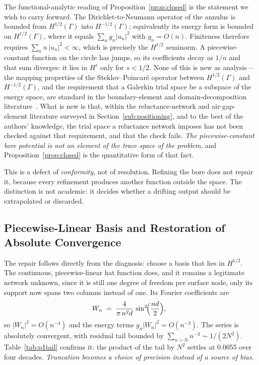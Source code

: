 \documentclass[10pt,a4paper,twocolumn]{article}
\theoremstyle{plain}
\theoremstyle{remark}
\begin{document}
The functional-analytic reading of Proposition~\ref{prop:closed} is the
statement we wish to carry forward. The Dirichlet-to-Neumann operator of
the annulus is bounded from $H^{1/2}(\Gamma)$ into $H^{-1/2}(\Gamma)$;
equivalently its energy form is bounded on $H^{1/2}(\Gamma)$, where it
equals $\sum_n g_n|u_n|^{2}$ with $g_n=O(n)$. Finiteness therefore
requires $\sum_n n\,|u_n|^{2}<\infty$, which is precisely the
$H^{1/2}$ seminorm. A piecewise-constant function on the circle has
jumps, so its coefficients decay as $1/n$ and that sum diverges: it lies
in $H^{s}$ only for $s<1/2$. None of this is new as analysis---the
mapping properties of the Steklov--Poincar\'e operator between
$H^{1/2}(\Gamma)$ and $H^{-1/2}(\Gamma)$, and the requirement that a
Galerkin trial space be a subspace of the energy space, are standard in
the boundary-element and domain-decomposition
literature~\cite{mclean2000,steinbach2008,sauter2011}. What is new is
that, within the reluctance-network and air-gap-element literature
surveyed in Section~\ref{sub:positioning}, and to the best of the
authors' knowledge, the trial space a reluctance network imposes has not
been checked against that requirement, and that the check fails. \emph{The piecewise-constant bore potential
is not an element of the trace space of the problem}, and
Proposition~\ref{prop:closed} is the quantitative form of that fact.

This is a defect of \emph{conformity}, not of resolution. Refining the
bore does not repair it, because every refinement produces another
function outside the space. The distinction is not academic: it decides
whether a drifting output should be extrapolated or discarded.


\subsection{Piecewise-Linear Basis and Restoration of Absolute Convergence}
\label{sub:p1}

The repair follows directly from the diagnosis: choose a basis that lies
in $H^{1/2}$. The continuous, piecewise-linear hat function does, and it
remains a legitimate network unknown, since it is still one degree of
freedom per surface node, only its support now spans two columns
instead of one. Its Fourier coefficients are
\begin{equation}
W_n\;=\;\frac{4}{\pi\,n^{2}d}\,\sin^{2}\!\Bigl(\frac{nd}{2}\Bigr),
\label{eq:Wn_p1}
\end{equation}
so $|W_n|^{2}=O(n^{-4})$ and the energy terms $g_n|W_n|^{2}=O(n^{-3})$.
The series is absolutely convergent, with residual tail bounded by
$\sum_{n>N}n^{-3}\sim1/(2N^{2})$. Table~\ref{tab:p1tail} confirms it:
the product of the tail by $N^{2}$ settles at \num{0.0055} over four
decades. \emph{Truncation becomes a choice of precision instead of a
source of bias.}
\end{document}
